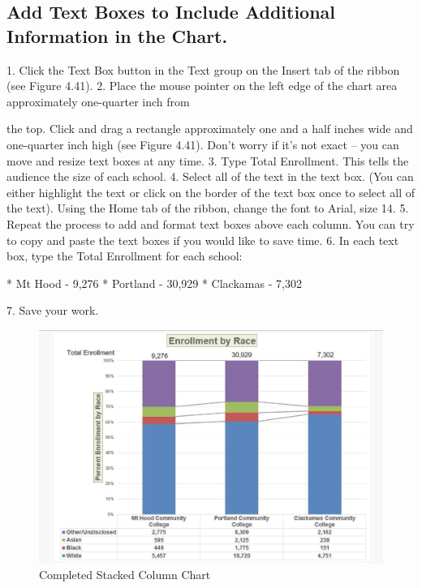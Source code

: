 \subsection{Add Text Boxes to Include Additional Information in the Chart.}

1. Click the Text Box button in the Text group on the Insert tab of the ribbon (see Figure 4.41).
2. Place the mouse pointer on the left edge of the chart area approximately one-quarter inch from

the top. Click and drag a rectangle approximately one and a half inches wide and one-quarter
inch high (see Figure 4.41). Don’t worry if it’s not exact – you can move and resize text boxes at
any time.
3.   Type Total Enrollment. This tells the audience the size of each school.
4.   Select all of the text in the text box. (You can either highlight the text or click on the border of
the text box once to select all of the text). Using the Home tab of the ribbon, change the font to
Arial, size 14.
5.   Repeat the process to add and format text boxes above each column. You can try to copy and
paste the text boxes if you would like to save time.
6.   In each text box, type the Total Enrollment for each school:

* Mt Hood - 9,276
* Portland - 30,929
* Clackamas - 7,302

7. Save your work.


\begin{figure}[H]
	\centering
	\includegraphics[width=\maxwidth{.95\linewidth}]{gfx/ch04_fig44}
	\caption{Completed Stacked Column Chart}
	\label{04:fig44}
\end{figure}




